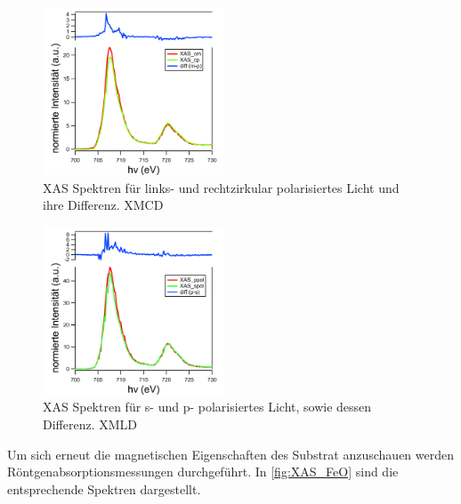         \begin{figure}
            \centering
            \includegraphics[height=5cm]{./content/pictures/FeO/XMCD_FeO.png}
            \caption{XAS Spektren für links- und rechtzirkular polarisiertes Licht und ihre Differenz. XMCD}
            \label{fig:XMCD}
        \end{figure}
        \begin{figure}
            \centering
            \includegraphics[height=5cm]{./content/pictures/FeO/XMLD_FeO.png}
            \caption{XAS Spektren für s- und p- polarisiertes Licht, sowie dessen Differenz. XMLD}
            \label{fig:XMLD}
        \end{figure}
        Um sich erneut die magnetischen Eigenschaften des Substrat anzuschauen werden Röntgenabsorptionsmessungen durchgeführt.
        In \autoref{fig:XAS_FeO} sind die entsprechende Spektren dargestellt.
        
